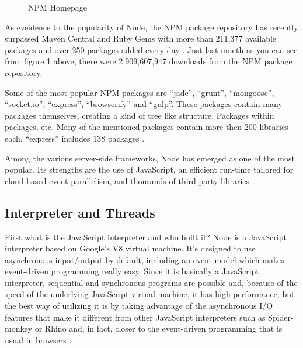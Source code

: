 \documentclass[12pt]{article} %
\begin{document}
\begin{figure}[H] %
\caption{NPM Homepage}
\label{fig:speciation}
\end{figure}
As eveidence to the popularity of Node, the NPM package repository has recently surpassed Maven Central and Ruby Gems with more than 211,377 available packages and over 250 packages added every day \cite{8}. 
Just last month as you can see from figure 1 above, there were 2,909,607,947 downloads from the NPM package repository.

Some of the most popular NPM packages are ``jade'', ``grunt'', ``mongoose'', ``socket.io'', ``express'', ``browserify'' and ``gulp''. These packages contain many packages themselves, creating a kind of tree like structure. Packages within packages, etc. Many of the mentioned packages contain more then 200 libraries each. ``express'' includes 138 packages \cite{12}.

Among the various server-side frameworks, Node has emerged as one of the most popular. Its strengths are the use of JavaScript, an efficient run-time tailored for cloud-based event parallelism, and thousands of third-party libraries \cite{12}.

\subsection{Interpreter and Threads}
First what is the JavaScript interpreter and who built it?
Node is a JavaScript interpreter based on Google's V8 virtual machine. It's designed to use 
asynchronous input/output by default, including an event model which makes event-driven programming really easy. Since it is basically a JavaScript interpreter, sequential and synchronous programs are possible and, because of the speed of the underlying JavaScript virtual machine, it has high performance, but the best way of utilizing it is by taking advantage of the asynchronous I/O features that make it different from other JavaScript interpreters such as Spider-monkey or Rhino and, in fact, closer to the event-driven programming that is usual in browsers \cite{6}.
\end{document}
